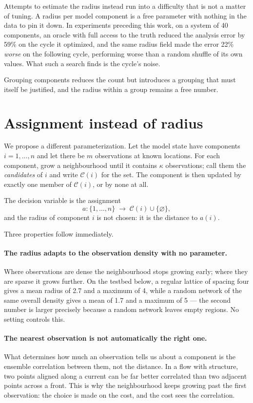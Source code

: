 \documentclass[11pt,a4paper]{article}
\begin{document}
Attempts to estimate the radius instead run into a difficulty that is not a
matter of tuning. A radius per model component is a free parameter with nothing
in the data to pin it down. In experiments preceding this work, on a system of
40 components, an oracle with full access to the truth reduced the analysis
error by 59\% on the cycle it optimized, and the same radius field made the
error 22\% \emph{worse} on the following cycle, performing worse than a random
shuffle of its own values. What such a search finds is the cycle's noise.

Grouping components reduces the count but introduces a grouping that must
itself be justified, and the radius within a group remains a free number.

\section{Assignment instead of radius}

We propose a different parameterization. Let the model state have components
$i = 1, \dots, n$ and let there be $m$ observations at known locations. For each
component, grow a neighbourhood until it contains $\kappa$ observations; call
them the \emph{candidates} of $i$ and write $\mathcal{C}(i)$ for the set. The
component is then updated by exactly one member of $\mathcal{C}(i)$, or by none
at all.

The decision variable is the assignment
%
\begin{equation}
  a : \{1, \dots, n\} \;\longrightarrow\; \mathcal{C}(i) \cup \{\varnothing\},
\end{equation}
%
and the radius of component $i$ is not chosen: it is the distance to $a(i)$.

Three properties follow immediately.

\paragraph{The radius adapts to the observation density with no parameter.}
Where observations are dense the neighbourhood stops growing early; where they
are sparse it grows further. On the testbed below, a regular lattice of spacing
four gives a mean radius of 2.7 and a maximum of 4, while a random network of
the same overall density gives a mean of 1.7 and a maximum of 5 --- the second
number is larger precisely because a random network leaves empty regions. No
setting controls this.

\paragraph{The nearest observation is not automatically the right one.}
What determines how much an observation tells us about a component is the
ensemble correlation between them, not the distance. In a flow with structure,
two points aligned along a current can be far better correlated than two
adjacent points across a front. This is why the neighbourhood keeps growing
past the first observation: the choice is made on the cost, and the cost sees
the correlation.
\end{document}
